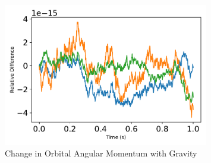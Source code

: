 \begin{figure}[htbp]\centerline{\includegraphics[width=0.8\textwidth]{AutoTeX/ChangeInOrbitalAngularMomentum}}\caption{Change in Orbital Angular Momentum with Gravity}\label{fig:ChangeInOrbitalAngularMomentum}\end{figure}